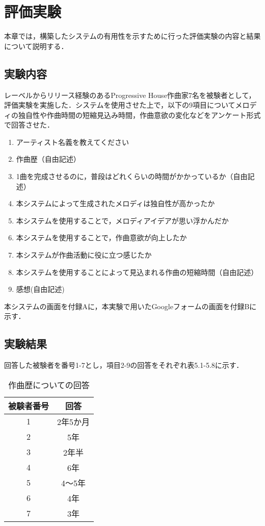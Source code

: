 \chapter{評価実験}
本章では，構築したシステムの有用性を示すために行った評価実験の内容と結果について説明する．

\section{実験内容}
レーベルからリリース経験のあるProgressive House作曲家7名を被験者として，評価実験を実施した．システムを使用させた上で，以下の9項目についてメロディの独自性や作曲時間の短縮見込み時間，作曲意欲の変化などをアンケート形式で回答させた．
\begin{enumerate}
  \item アーティスト名義を教えてください
  \item 作曲歴（自由記述）
  \item 1曲を完成させるのに，普段はどれくらいの時間がかかっているか（自由記述）
  \item 本システムによって生成されたメロディは独自性が高かったか
  \item 本システムを使用することで，メロディアイデアが思い浮かんだか
  \item 本システムを使用することで，作曲意欲が向上したか
  \item 本システムが作曲活動に役に立つ感じたか
  \item 本システムを使用することによって見込まれる作曲の短縮時間（自由記述）
  \item 感想(自由記述)
\end{enumerate}
本システムの画面を付録Aに，本実験で用いたGoogleフォームの画面を付録Bに示す．

\section{実験結果}
回答した被験者を番号1-7とし，項目2-9の回答をそれぞれ表5.1-5.8に示す．

\begin{table}[htbp]
  \begin{center}
    \caption{作曲歴についての回答}
    \begin{tabular}{|c|c|}
      \hline
      被験者番号 & 回答 \rule[-3mm]{0mm}{8mm}\\ \hline \hline
      1 & 2年5か月\rule[-3mm]{0mm}{8mm} \\ \hline
      2 & 5年\rule[-3mm]{0mm}{8mm} \\ \hline
      3 & 2年半\rule[-3mm]{0mm}{8mm} \\ \hline
      4 & 6年\rule[-3mm]{0mm}{8mm} \\ \hline
      5 & 4〜5年\rule[-3mm]{0mm}{8mm} \\ \hline
      6 & 4年\rule[-3mm]{0mm}{8mm} \\ \hline
      7 & 3年\rule[-3mm]{0mm}{8mm} \\ \hline
    \end{tabular}
  \end{center}
\end{table}


